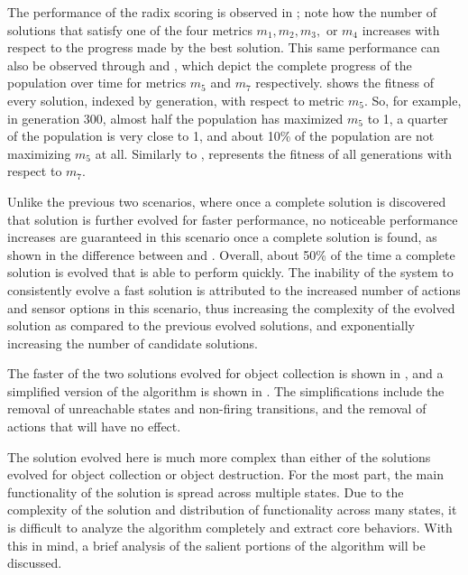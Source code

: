 The performance of the radix scoring is observed in ; note how the number of solutions that satisfy one of the four metrics $m_1, m_2, m_3,$ or $m_4$ increases with respect to the progress made by the best solution.  This same performance can also be observed through  and , which depict the complete progress of the population over time for metrics $m_5$ and $m_7$ respectively.   shows the fitness of every solution, indexed by generation, with respect to metric $m_5$.  So, for example, in generation 300, almost half the population has maximized $m_5$ to 1, a quarter of the population is very close to 1, and about 10\% of the population are not maximizing $m_5$ at all.  Similarly to ,  represents the fitness of all generations with respect to $m_7$.

Unlike the previous two scenarios, where once a complete solution is discovered that solution is further evolved for faster performance, no noticeable performance increases are guaranteed in this scenario once a complete solution is found, as shown in the difference between  and .  Overall, about 50\% of the time a complete solution is evolved that is able to perform quickly.  The inability of the system to consistently evolve a fast solution is attributed to the increased number of actions and sensor options in this scenario,  thus increasing the complexity of the evolved solution as compared to the previous evolved solutions, and exponentially increasing the number of candidate solutions.

The faster of the two solutions evolved for object collection is shown in , and a simplified version of the algorithm is shown in .  The simplifications include the removal of unreachable states and non-firing transitions, and the removal of actions that will have no effect.  

The solution evolved here is much more complex than either of the solutions evolved for object collection or object destruction.   For the most part, the main functionality of the solution is spread across multiple states.  Due to the complexity of the solution and distribution of functionality across many states, it is difficult to analyze the algorithm completely and extract core behaviors.  With this in mind, a brief analysis of the salient portions of the algorithm will be discussed.

